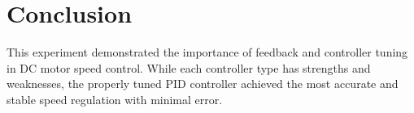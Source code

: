 \documentclass[12pt]{article}
\begin{document}
\section*{Conclusion}
This experiment demonstrated the importance of feedback and controller tuning in DC motor speed control. While each controller type has strengths and weaknesses, the properly tuned PID controller achieved the most accurate and stable speed regulation with minimal error.



\renewcommand{\bibname}{References}

\end{document}
